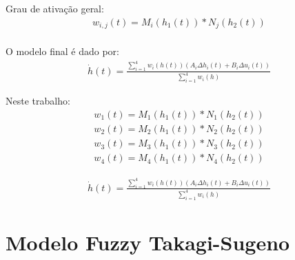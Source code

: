 	Grau de ativação geral:
	\begin{equation}
		\begin{aligned}
			w_{i,j}(t) = M_i(h_1(t)) * N_j(h_2(t)) \\
		\end{aligned}
	\end{equation}
	
	O modelo final é dado por:
	\begin{align}
		\dot{h}(t) = \frac{\sum_{i=1}^{4}  w_i(h(t))(A_i \Delta h_i(t) +  B_i \Delta u_i(t))}{\sum_{i=1}^{4} w_i(h)}
	\end{align}
	
	Neste trabalho:
	\begin{equation}
	\begin{aligned}
		w_{1}(t) = M_1(h_1(t)) * N_1(h_2(t)) \\
		w_{2}(t) = M_2(h_1(t)) * N_2(h_2(t)) \\
		w_{3}(t) = M_3(h_1(t)) * N_3(h_2(t)) \\
		w_{4}(t) = M_4(h_1(t)) * N_4(h_2(t))
	\end{aligned}
	\end{equation}
	
	\begin{align}
		\dot{h}(t) = \frac{\sum_{i=1}^{4}  w_i(h(t))(A_i \Delta h_i(t) +  B_i \Delta u_i(t))}{\sum_{i=1}^{4} w_i(h)}
	\end{align}


\section{Modelo Fuzzy Takagi-Sugeno}


%

